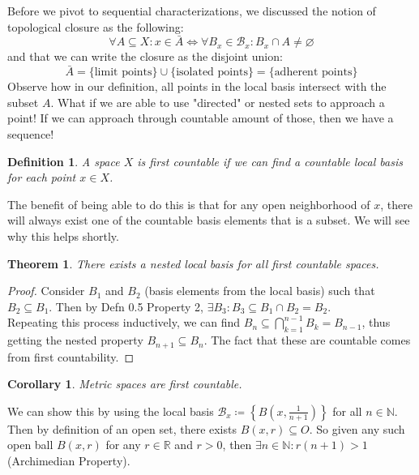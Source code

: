\documentclass{exam}
\newtheorem{thm}{Theorem}[section]
\newtheorem{defn}{Definition}[section]
\newtheorem{cor}{Corollary}[section]
\begin{document}
Before we pivot to sequential characterizations, we discussed the notion of topological closure as the following:
\begin{equation*}
  \forall A \subseteq X: x \in \bar{A} \iff \forall B_x \in \mathcal{B}_x: B_x \cap A \neq \varnothing
\end{equation*}
and that we can write the closure as the disjoint union:
\begin{equation*}
  \bar{A} = \{\text{limit points}\} \cup \{\text{isolated points}\} = \{\text{adherent points}\}
\end{equation*}
Observe how in our definition, all points in the local basis intersect with the subset $A$. What if we are able to use "directed" or nested sets to approach a point! If we can approach through countable amount of those, then we have a sequence!
\begin{defn}
A space $X$ is first countable if we can find a countable local basis for each point $x \in X$.
\end{defn}
The benefit of being able to do this is that for any open neighborhood of $x$, there will always exist one of the countable basis elements that is a subset. We will see why this helps shortly.\\
\begin{thm}
There exists a nested local basis for all first countable spaces.
\end{thm}
\begin{proof}
Consider $B_1$ and $B_2$ (basis elements from the local basis) such that $B_2 \subseteq B_1$. Then by Defn 0.5 Property 2, $\exists B_3: B_3 \subseteq B_1 \cap B_2 = B_2$.\\

Repeating this process inductively, we can find $B_n \subseteq \bigcap_{k=1}^{n-1}B_k = B_{n-1}$, thus getting the nested property $B_{n+1} \subseteq B_n$. The fact that these are countable comes from first countability.
\end{proof}
\begin{cor}
Metric spaces are first countable.
\end{cor}
We can show this by using the local basis $\mathcal{B}_x \coloneq \left\{B\left(x, \frac{1}{n+1}\right)\right\}$ for all $n \in \mathbb{N}$. Then by definition of an open set, there exists $B(x, r) \subseteq O$. So given any such open ball $B(x, r)$ for any $r \in \mathbb{R}$ and $r > 0$, then $\exists n \in \mathbb{N}: r(n+1) > 1$ (Archimedian Property).\\
\end{document}

